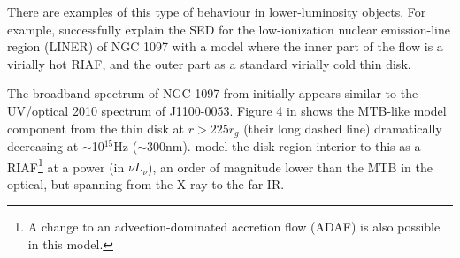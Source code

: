 \documentclass[a4paper,fleqn,usenatbib]{mnras}
\begin{document}
There are examples of this type of behaviour in lower-luminosity
objects.  For example, \citet{Nemmen2006} successfully explain the SED
for the low-ionization nuclear emission-line region (LINER) of NGC
1097 with a model where the inner part of the flow is a virially hot
RIAF, and the outer part as a standard virially cold thin disk.

The broadband spectrum of NGC 1097 from \citet{Nemmen2006} initially
appears similar to the UV/optical 2010 spectrum of J1100-0053.  Figure
4 in \citet{Nemmen2006} shows the MTB-like model component from the
thin disk at $r>225r_{g}$ (their long dashed line) dramatically
decreasing at $\sim$10$^{15}$Hz ($\sim$300nm). \citet{Nemmen2006}
model the disk region interior to this as a RIAF\footnote{A change to
an advection-dominated accretion flow (ADAF) is also possible in this
model.} at a power (in $\nu L_{\nu}$), an order of magnitude lower
than the MTB in the optical, but spanning from the X-ray to the
far-IR.
\end{document}

